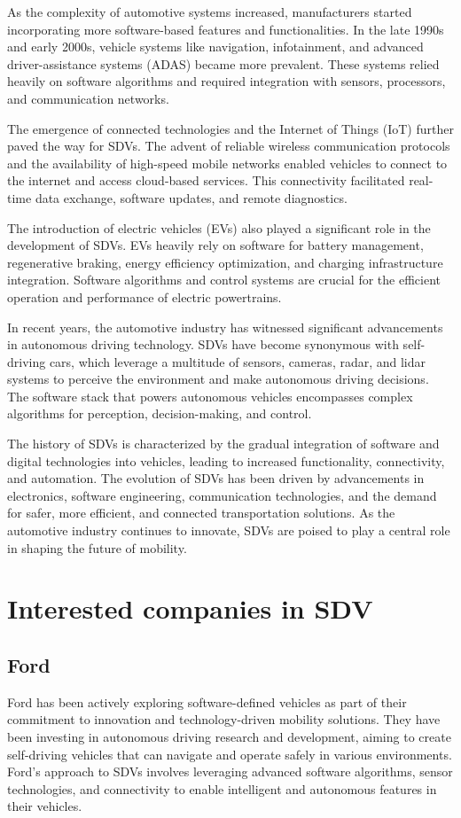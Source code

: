 \documentclass[
12pt,
oneside, 
onehalfspacing, 
nolistspacing, 
parskip, 
chapterinoneline, 
]{AASTCOMPUTER}
\begin{document}
As the complexity of automotive systems increased, manufacturers started incorporating more software-based features and functionalities. In the late 1990s and early 2000s, vehicle systems like navigation, infotainment, and advanced driver-assistance systems (ADAS) became more prevalent. These systems relied heavily on software algorithms and required integration with sensors, processors, and communication networks.

The emergence of connected technologies and the Internet of Things (IoT) further paved the way for SDVs. The advent of reliable wireless communication protocols and the availability of high-speed mobile networks enabled vehicles to connect to the internet and access cloud-based services. This connectivity facilitated real-time data exchange, software updates, and remote diagnostics.

The introduction of electric vehicles (EVs) also played a significant role in the development of SDVs. EVs heavily rely on software for battery management, regenerative braking, energy efficiency optimization, and charging infrastructure integration. Software algorithms and control systems are crucial for the efficient operation and performance of electric powertrains.

In recent years, the automotive industry has witnessed significant advancements in autonomous driving technology. SDVs have become synonymous with self-driving cars, which leverage a multitude of sensors, cameras, radar, and lidar systems to perceive the environment and make autonomous driving decisions. The software stack that powers autonomous vehicles encompasses complex algorithms for perception, decision-making, and control.

The history of SDVs is characterized by the gradual integration of software and digital technologies into vehicles, leading to increased functionality, connectivity, and automation. The evolution of SDVs has been driven by advancements in electronics, software engineering, communication technologies, and the demand for safer, more efficient, and connected transportation solutions. As the automotive industry continues to innovate, SDVs are poised to play a central role in shaping the future of mobility.

\section{Interested companies in SDV}
\subsection{Ford}
Ford has been actively exploring software-defined vehicles as part of their commitment to innovation and technology-driven mobility solutions. They have been investing in autonomous driving research and development, aiming to create self-driving vehicles that can navigate and operate safely in various environments. Ford's approach to SDVs involves leveraging advanced software algorithms, sensor technologies, and connectivity to enable intelligent and autonomous features in their vehicles.
\end{document}

